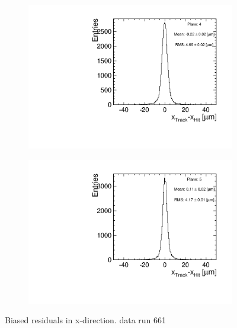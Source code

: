 \begin{figure}[htbp]
\begin{subfigure}[b]{0.3\textwidth}
    \includegraphics[width=\textwidth]{figures/Telescope/biasedResiduals/BiasedResiduals_run661_PlaneXRMS4.pdf}
    \caption{}
  \end{subfigure}\hfill
  \begin{subfigure}[b]{0.3\textwidth}
    \includegraphics[width=\textwidth]{figures/Telescope/biasedResiduals/BiasedResiduals_run661_PlaneXRMS5.pdf}
    \caption{}
  \end{subfigure}
  \caption{Biased residuals in x-direction. data run 661}
  \label{fig:telescope_biasedResiduals_data_X}
\end{figure}

